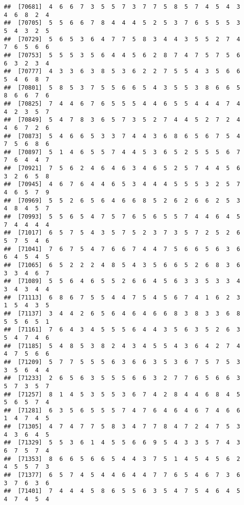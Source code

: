 \documentclass[
]{book}
\begin{document}
\begin{verbatim}
##  [70681]  4  6  6  7  3  5  5  7  3  7  7  5  8  5  7  4  5  4  3  4  6  8  2  4
##  [70705]  5  5  6  6  7  8  4  4  4  5  2  5  3  7  6  5  5  5  3  5  4  3  2  5
##  [70729]  5  6  5  3  6  4  7  7  5  8  3  4  4  3  5  5  2  7  4  7  6  5  6  6
##  [70753]  5  5  5  3  5  6  4  4  5  6  2  8  7  4  7  5  7  5  6  6  3  2  3  4
##  [70777]  4  3  3  6  3  8  5  3  6  2  2  7  5  5  4  3  5  6  6  5  4  6  8  7
##  [70801]  5  8  5  3  7  5  5  6  6  5  4  3  5  5  3  8  6  6  5  8  6  6  7  6
##  [70825]  7  4  4  6  7  6  5  5  5  4  4  6  5  5  4  4  4  7  4  4  2  3  5  7
##  [70849]  5  4  7  8  3  6  5  7  3  5  2  7  4  4  5  2  7  2  4  4  6  7  2  6
##  [70873]  5  4  6  6  5  3  3  7  4  4  3  6  8  6  5  6  7  5  4  7  5  6  8  6
##  [70897]  5  1  4  6  5  5  7  4  4  5  3  6  5  2  5  5  5  6  7  7  6  4  4  7
##  [70921]  7  5  6  2  4  6  4  6  3  4  6  5  2  5  7  4  4  5  6  3  2  6  5  8
##  [70945]  4  6  7  6  4  4  6  5  3  4  4  4  5  5  5  3  2  5  7  4  6  5  7  9
##  [70969]  5  5  2  6  5  6  4  6  6  8  5  2  6  2  6  6  2  5  3  4  8  4  5  7
##  [70993]  5  5  6  5  4  7  5  7  6  5  6  5  5  7  4  4  6  4  5  7  4  4  4  4
##  [71017]  6  5  7  5  4  3  5  7  5  2  3  7  3  5  7  2  5  2  6  5  7  5  4  6
##  [71041]  7  6  7  5  4  7  6  6  7  4  4  7  5  6  6  5  6  3  6  6  4  5  4  5
##  [71065]  6  5  2  2  2  4  8  5  4  3  5  6  6  5  2  6  8  3  6  3  3  4  6  7
##  [71089]  5  5  6  4  6  5  5  2  6  6  4  5  6  3  3  5  3  3  4  3  4  3  4  4
##  [71113]  6  8  6  7  5  5  4  4  7  5  4  5  6  7  4  1  6  2  3  1  5  4  3  5
##  [71137]  3  4  4  2  6  5  6  4  6  4  6  6  8  3  8  3  3  6  8  5  5  6  5  1
##  [71161]  7  6  4  3  4  5  5  5  6  4  4  3  5  6  3  5  2  6  3  5  4  7  4  6
##  [71185]  5  4  8  5  3  8  2  4  3  4  5  5  4  3  6  4  2  7  4  4  7  5  6  6
##  [71209]  5  7  7  5  5  5  6  3  6  6  3  5  3  6  7  5  7  5  3  3  5  6  4  4
##  [71233]  2  6  5  6  3  5  5  5  6  6  3  2  7  7  6  5  6  6  3  5  7  3  5  7
##  [71257]  8  1  4  5  3  5  5  3  6  7  4  2  8  4  4  6  8  4  5  5  6  5  7  4
##  [71281]  6  3  5  6  5  5  5  7  4  7  6  4  6  4  6  7  4  6  6  1  4  7  4  5
##  [71305]  4  7  4  7  7  5  8  3  4  7  7  8  4  7  2  4  7  5  3  4  3  6  4  5
##  [71329]  5  5  3  6  1  4  5  5  6  6  9  5  4  3  3  5  7  4  3  6  7  5  7  4
##  [71353]  8  6  6  5  6  6  5  4  4  3  7  5  1  4  5  4  5  6  2  4  5  5  7  3
##  [71377]  6  5  7  4  5  4  4  6  4  4  7  7  6  5  4  6  7  3  6  3  7  6  3  6
##  [71401]  7  4  4  4  5  8  6  5  5  6  3  5  4  7  5  4  6  4  5  4  7  4  5  4

\end{verbatim}
\end{document}
